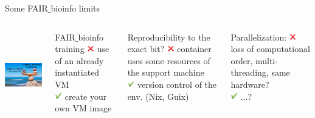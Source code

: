 \begin{frame}{Some FAIR$\_$bioinfo limits}
\begin{columns}
\begin{center}
    \includegraphics[height=3.8cm]{09_conclusion/images/FAIR_equilibre.png}
\end{center}
\begin{block}{FAIR$\_$bioinfo training}
\includegraphics[height=0.3cm]{05_history/Images/FAIR_no.png} use of an already instantiated VM\\
\includegraphics[height=0.3cm]{05_history/Images/FAIR_yes.png} create your own VM image
\end{block}
\begin{block}{Reproducibility to the exact bit?}
\includegraphics[height=0.3cm]{05_history/Images/FAIR_no.png} container uses some resources of the support machine\\
\includegraphics[height=0.3cm]{05_history/Images/FAIR_yes.png} version control of the env. (Nix, Guix)
\end{block}
\begin{block}{Parallelization:}
\includegraphics[height=0.3cm]{05_history/Images/FAIR_no.png} loss of computational order, multi-threading, same hardware?\\
\includegraphics[height=0.3cm]{05_history/Images/FAIR_yes.png}
...?
\end{block}
\end{columns}
\end{frame}

